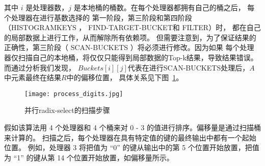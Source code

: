 其中 $i$ 是处理器数，$j$ 是本地桶的桶数。在每个处理器都拥有自己的桶之后，
每个处理器在进行基数选择的
第一阶段，第三阶段和第四阶段（HISTOGRAMKEYS ， FIND-TARGET-BUCKET和 FILTER）时，
都在自己的局部数据上进行工作，从而解除所有依赖项。
但需要注意到，为了保证结果的正确性，第三阶段（ SCAN-BUCKETS ）将必须进行修改。因为如果
每个处理器仅扫描自己的本地桶，将仅仅只能得到局部数据的Top-k结果，导致结果错误。而通过分析我们发现，
$Buckets[i][j]$代表在进行SCAN-BUCKETS处理后，$A$中元素最终在结果$R$中的偏移位置，
具体关系见下图~\ref{fig:digits}。
\begin{figure}[ht]
    \centering
    \texttt{[image: process\_digits.jpg]}
    \caption{并行radix-select的扫描步骤}
    \label{fig:digits}
\end{figure}

假如该算法用 4 个处理器和 4 个桶来对 0 - 3 的值进行排序。偏移量是通过扫描桶来计算的。
扫描之后，每个处理器在具有特定值的键的最终输出中都有一个起始位置。
例如，处理器 3 将把值为 “0” 的键从输出中的第 5 个位置开始放置，把值为 “1” 的键从第 14 个位置开始放置，如偏移量所示。

